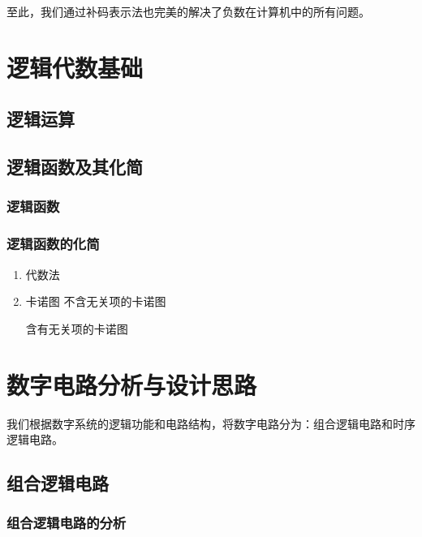 \documentclass[UTF8]{article}
\begin{document}
至此，我们通过补码表示法也完美的解决了负数在计算机中的所有问题。


\section{逻辑代数基础}

\subsection{逻辑运算}

\subsection{逻辑函数及其化简}

\subsubsection{逻辑函数}

\subsubsection{逻辑函数的化简}

\begin{enumerate}
    \item 代数法
    

    \item 卡诺图
        \subitem 不含无关项的卡诺图

        \subitem 含有无关项的卡诺图
        
\end{enumerate}


\section{数字电路分析与设计思路}

我们根据数字系统的逻辑功能和电路结构，将数字电路分为：组合逻辑电路和时序逻辑电路。

\subsection{组合逻辑电路}

\subsubsection{组合逻辑电路的分析}
\end{document}
